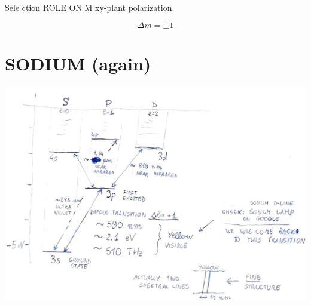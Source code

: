 \documentclass[10pt]{article}
\begin{document}
Sele ction ROLE ON M xy-plant polarization.

$$
\Delta m= \pm 1
$$

\section*{SODIUM (again)}
\begin{center}
\includegraphics[max width=\textwidth]{2025_10_16_22329e0f50bdd2511b17g-16}
\end{center}
\end{document}
